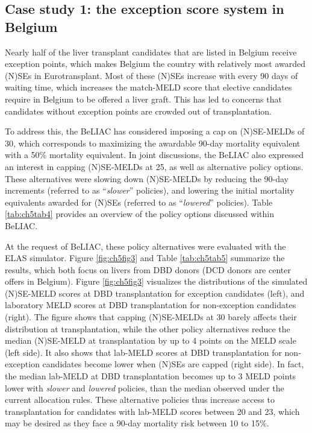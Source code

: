 \documentclass[11pt,twoside,]{book}
\begin{document}
\subsection{Case study 1: the exception score system in Belgium}\label{sec:elasbeliaccasestudy}

Nearly half of the liver transplant candidates that are listed in Belgium
receive exception points, which makes Belgium the country with relatively
most awarded (N)SEs in Eurotransplant. Most of these (N)SEs increase with every
90 days of waiting time, which increases the match-MELD score that elective
candidates require in Belgium to be offered a liver graft. This has led to
concerns that candidates without exception points are crowded out of transplantation.

To address this, the BeLIAC has considered imposing a cap on (N)SE-MELDs
of 30, which corresponds to maximizing the awardable 90-day mortality
equivalent with a 50\% mortality equivalent. In joint discussions, the
BeLIAC also expressed an interest in capping (N)SE-MELDs at 25, as well as
alternative policy options. These alternatives were slowing down (N)SE-MELDs by
reducing the 90-day increments (referred to as ``\emph{slower}'' policies), and lowering
the initial mortality equivalents awarded for (N)SEs (referred to as
``\emph{lowered}'' policies). Table \ref{tab:ch5tab4} provides an overview
of the policy options discussed within BeLIAC.

At the request of BeLIAC, these policy alternatives were evaluated with the
ELAS simulator. Figure \ref{fig:ch5fig3} and
Table \ref{tab:ch5tab5} summarize the results, which both focus on livers
from DBD donors (DCD donors are center offers in Belgium). Figure
\ref{fig:ch5fig3} visualizes the distributions of the simulated
(N)SE-MELD scores at DBD transplantation for exception candidates (left),
and laboratory MELD scores at DBD transplantation for non-exception
candidates (right). The figure shows that capping (N)SE-MELDs at 30
barely affects their distribution at transplantation, while the other
policy alternatives reduce the median (N)SE-MELD at transplantation by up to 4 points
on the MELD scale (left side).
It also shows that lab-MELD scores at DBD transplantation for non-exception
candidates become lower when (N)SEs are capped (right side). In fact,
the median lab-MELD at DBD transplantation
becomes up to 3 MELD points lower with \emph{slower} and \emph{lowered} policies, than the median observed under the current allocation rules. These alternative policies thus increase access to
transplantation for candidates with lab-MELD scores between 20 and 23,
which may be desired as they face a 90-day
mortality risk between 10 to 15\%.
\end{document}
